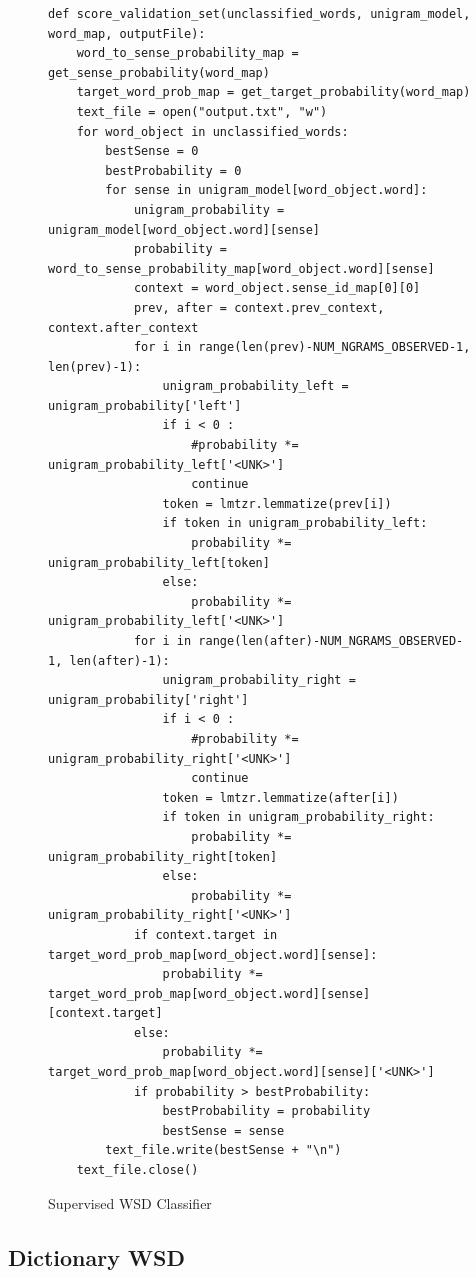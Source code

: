 \documentclass[11pt]{article}
\begin{document}
\begin{figure}[ht]
\begin{lstlisting}
def score_validation_set(unclassified_words, unigram_model, word_map, outputFile):
    word_to_sense_probability_map = get_sense_probability(word_map)
    target_word_prob_map = get_target_probability(word_map)
    text_file = open("output.txt", "w")
    for word_object in unclassified_words:
        bestSense = 0
        bestProbability = 0
        for sense in unigram_model[word_object.word]:
            unigram_probability = unigram_model[word_object.word][sense]
            probability = word_to_sense_probability_map[word_object.word][sense]
            context = word_object.sense_id_map[0][0]
            prev, after = context.prev_context, context.after_context
            for i in range(len(prev)-NUM_NGRAMS_OBSERVED-1, len(prev)-1):
                unigram_probability_left = unigram_probability['left']
                if i < 0 :
                    #probability *= unigram_probability_left['<UNK>']
                    continue
                token = lmtzr.lemmatize(prev[i])
                if token in unigram_probability_left:
                    probability *= unigram_probability_left[token]
                else:
                    probability *= unigram_probability_left['<UNK>']
            for i in range(len(after)-NUM_NGRAMS_OBSERVED-1, len(after)-1):
                unigram_probability_right = unigram_probability['right']
                if i < 0 :
                    #probability *= unigram_probability_right['<UNK>']
                    continue
                token = lmtzr.lemmatize(after[i])
                if token in unigram_probability_right:
                    probability *= unigram_probability_right[token]
                else:
                    probability *= unigram_probability_right['<UNK>']
            if context.target in target_word_prob_map[word_object.word][sense]:
                probability *= target_word_prob_map[word_object.word][sense][context.target]
            else:
                probability *= target_word_prob_map[word_object.word][sense]['<UNK>']
            if probability > bestProbability:
                bestProbability = probability
                bestSense = sense
        text_file.write(bestSense + "\n")
    text_file.close()
\end{lstlisting}
\caption{Supervised WSD Classifier}
\label{classifier}	
\end{figure}	

\subsection{Dictionary WSD}
\end{document}
